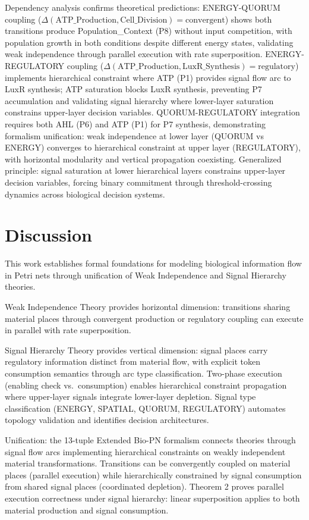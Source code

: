 \documentclass[twocolumn,11pt]{article}
\newcommand{\DepType}[2]{\ensuremath{\Delta(#1,#2)}}
\begin{document}
Dependency analysis confirms theoretical predictions: ENERGY-QUORUM coupling ($\DepType{\text{ATP\_Production}}{\text{Cell\_Division}} = \text{convergent}$) shows both transitions produce Population\_Context (P8) without input competition, with population growth in both conditions despite different energy states, validating weak independence through parallel execution with rate superposition. ENERGY-REGULATORY coupling ($\DepType{\text{ATP\_Production}}{\text{LuxR\_Synthesis}} = \text{regulatory}$) implements hierarchical constraint where ATP (P1) provides signal flow arc to LuxR synthesis; ATP saturation blocks LuxR synthesis, preventing P7 accumulation and validating signal hierarchy where lower-layer saturation constrains upper-layer decision variables. QUORUM-REGULATORY integration requires both AHL (P6) and ATP (P1) for P7 synthesis, demonstrating formalism unification: weak independence at lower layer (QUORUM vs ENERGY) converges to hierarchical constraint at upper layer (REGULATORY), with horizontal modularity and vertical propagation coexisting. Generalized principle: signal saturation at lower hierarchical layers constrains upper-layer decision variables, forcing binary commitment through threshold-crossing dynamics across biological decision systems.



\section{Discussion}

This work establishes formal foundations for modeling biological information flow in Petri nets through unification of Weak Independence and Signal Hierarchy theories.

Weak Independence Theory provides horizontal dimension: transitions sharing material places through convergent production or regulatory coupling can execute in parallel with rate superposition.

Signal Hierarchy Theory provides vertical dimension: signal places carry regulatory information distinct from material flow, with explicit token consumption semantics through arc type classification. Two-phase execution (enabling check vs.\ consumption) enables hierarchical constraint propagation \cite{Herajy2017} where upper-layer signals integrate lower-layer depletion. Signal type classification (ENERGY, SPATIAL, QUORUM, REGULATORY) automates topology validation and identifies decision architectures.

Unification: the 13-tuple Extended Bio-PN formalism connects theories through signal flow arcs implementing hierarchical constraints on weakly independent material transformations. Transitions can be convergently coupled on material places (parallel execution) while hierarchically constrained by signal consumption from shared signal places (coordinated depletion). Theorem 2 proves parallel execution correctness under signal hierarchy: linear superposition applies to both material production and signal consumption.
\end{document}
